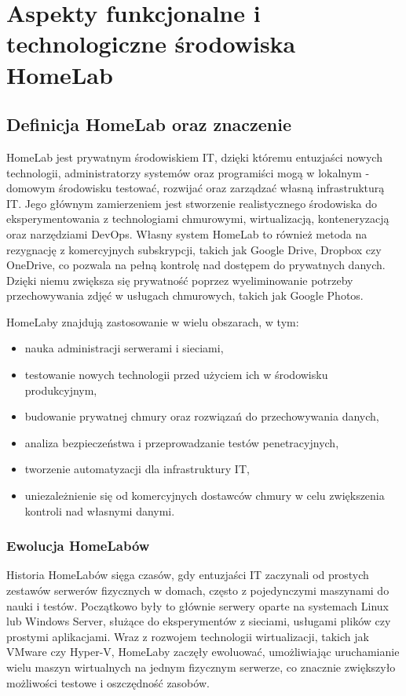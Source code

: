 \chapter{Aspekty funkcjonalne i technologiczne środowiska HomeLab}

\section{Definicja HomeLab oraz znaczenie}
HomeLab jest prywatnym środowiskiem IT, dzięki któremu entuzjaści nowych technologii, administratorzy systemów oraz programiści mogą w lokalnym - domowym środowisku testować, rozwijać oraz zarządzać własną infrastrukturą IT. Jego głównym zamierzeniem jest stworzenie realistycznego środowiska do eksperymentowania z technologiami chmurowymi, wirtualizacją, konteneryzacją oraz narzędziami DevOps. Własny system HomeLab to również metoda na rezygnację z komercyjnych subskrypcji, takich jak Google Drive, Dropbox czy OneDrive, co pozwala na pełną kontrolę nad dostępem do prywatnych danych. Dzięki niemu zwiększa się prywatność poprzez wyeliminowanie potrzeby przechowywania zdjęć w usługach chmurowych, takich jak Google Photos.

HomeLaby znajdują zastosowanie w wielu obszarach, w tym:
\begin{itemize}
    \item nauka administracji serwerami i sieciami,
    \item testowanie nowych technologii przed użyciem ich w środowisku produkcyjnym,
    \item budowanie prywatnej chmury oraz rozwiązań do przechowywania danych,
    \item analiza bezpieczeństwa i przeprowadzanie testów penetracyjnych,
    \item tworzenie automatyzacji dla infrastruktury IT,
    \item uniezależnienie się od komercyjnych dostawców chmury w celu zwiększenia kontroli nad własnymi danymi.
\end{itemize}

\subsection{Ewolucja HomeLabów}
Historia HomeLabów sięga czasów, gdy entuzjaści IT zaczynali od prostych zestawów serwerów fizycznych w domach, często z pojedynczymi maszynami do nauki i testów. Początkowo były to głównie serwery oparte na systemach Linux lub Windows Server, służące do eksperymentów z sieciami, usługami plików czy prostymi aplikacjami. Wraz z rozwojem technologii wirtualizacji, takich jak VMware czy Hyper-V, HomeLaby zaczęły ewoluować, umożliwiając uruchamianie wielu maszyn wirtualnych na jednym fizycznym serwerze, co znacznie zwiększyło możliwości testowe i oszczędność zasobów.

